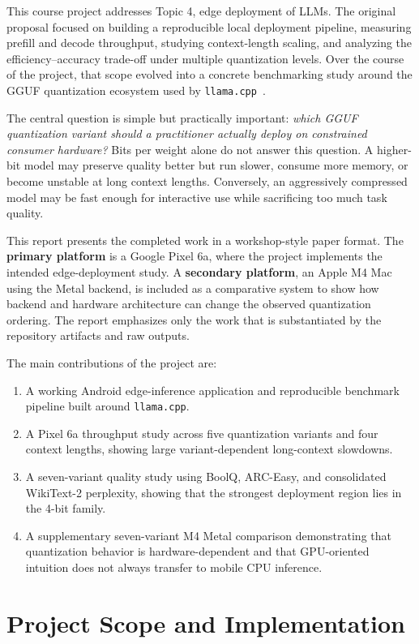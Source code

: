 \documentclass{article}
\begin{document}
This course project addresses Topic 4, edge deployment of LLMs. The original proposal focused on building a reproducible local deployment pipeline, measuring prefill and decode throughput, studying context-length scaling, and analyzing the efficiency--accuracy trade-off under multiple quantization levels. Over the course of the project, that scope evolved into a concrete benchmarking study around the GGUF quantization ecosystem used by \texttt{llama.cpp}~\cite{llamacpp}.

The central question is simple but practically important: \emph{which GGUF quantization variant should a practitioner actually deploy on constrained consumer hardware?} Bits per weight alone do not answer this question. A higher-bit model may preserve quality better but run slower, consume more memory, or become unstable at long context lengths. Conversely, an aggressively compressed model may be fast enough for interactive use while sacrificing too much task quality.

This report presents the completed work in a workshop-style paper format. The \textbf{primary platform} is a Google Pixel 6a, where the project implements the intended edge-deployment study. A \textbf{secondary platform}, an Apple M4 Mac using the Metal backend, is included as a comparative system to show how backend and hardware architecture can change the observed quantization ordering. The report emphasizes only the work that is substantiated by the repository artifacts and raw outputs.

The main contributions of the project are:
\begin{enumerate}
  \item A working Android edge-inference application and reproducible benchmark pipeline built around \texttt{llama.cpp}.
  \item A Pixel 6a throughput study across five quantization variants and four context lengths, showing large variant-dependent long-context slowdowns.
  \item A seven-variant quality study using BoolQ, ARC-Easy, and consolidated WikiText-2 perplexity, showing that the strongest deployment region lies in the 4-bit family.
  \item A supplementary seven-variant M4 Metal comparison demonstrating that quantization behavior is hardware-dependent and that GPU-oriented intuition does not always transfer to mobile CPU inference.
\end{enumerate}

\section{Project Scope and Implementation}
\label{sec:scope}
\end{document}
